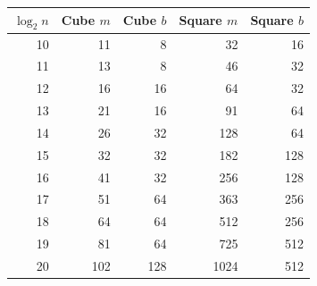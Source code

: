 \begin{tabular}{rrrrr}
\hline
$\log_2 n$ & Cube $m$ & Cube $b$ & Square $m$ & Square $b$ \\
\hline
10 & 11 & 8 & 32 & 16 \\
11 & 13 & 8 & 46 & 32 \\
12 & 16 & 16 & 64 & 32 \\
13 & 21 & 16 & 91 & 64 \\
14 & 26 & 32 & 128 & 64 \\
15 & 32 & 32 & 182 & 128 \\
16 & 41 & 32 & 256 & 128 \\
17 & 51 & 64 & 363 & 256 \\
18 & 64 & 64 & 512 & 256 \\
19 & 81 & 64 & 725 & 512 \\
20 & 102 & 128 & 1024 & 512 \\
\hline
\end{tabular}
